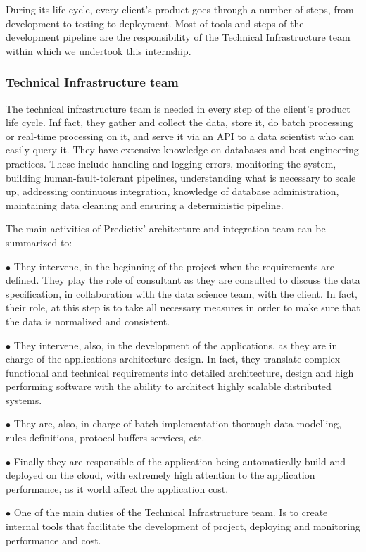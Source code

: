 During its life cycle, every client's product goes through a number of steps,
from development to testing to deployment. Most of tools and steps of the
development pipeline are the responsibility of the Technical Infrastructure team
within which we undertook this internship.

\subsubsection{Technical Infrastructure team}

The technical infrastructure team is needed in every step of the client's
product life cycle. Inf  fact, they gather and collect the data, store it, do
batch processing or real-time processing on it, and serve it via an API to a data
scientist who can easily query it. They have extensive knowledge on databases
and best engineering practices. These include handling and logging errors,
monitoring the system, building human-fault-tolerant pipelines, understanding
what is necessary to scale up, addressing continuous integration, knowledge of
database administration, maintaining data cleaning and ensuring a deterministic
pipeline.

The main activities of Predictix' architecture and integration team can be
summarized to:

$\bullet$ They intervene, in the beginning of the project when the requirements are
defined. They play the role of consultant as they are consulted to discuss the
data specification, in collaboration with the data science team, with the
client. In fact, their role, at this step is to take all necessary measures in
order to make sure that the data is normalized and consistent.

$\bullet$ They intervene, also, in the development of the applications, as they are in
charge of the applications architecture design. In fact, they translate complex
functional and technical requirements into detailed architecture, design and
high performing software with the ability to architect highly scalable
distributed systems.

$\bullet$ They are, also, in charge of batch implementation thorough data modelling, rules
definitions, protocol buffers services, etc.

$\bullet$ Finally they are responsible of the application being automatically build and
deployed on the cloud, with extremely high attention to the application
performance, as it world affect the application cost.

$\bullet$ One of the main duties of the Technical Infrastructure team. Is to create
internal tools that facilitate the development of project, deploying and
monitoring performance and cost.

